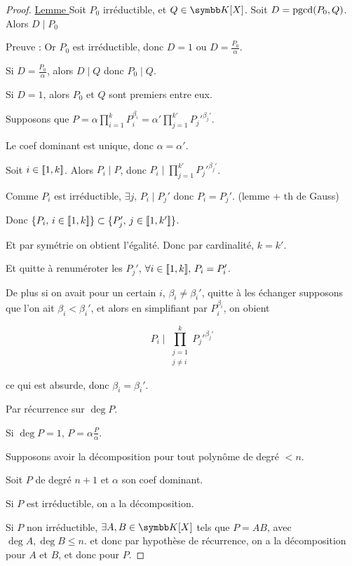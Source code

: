 
\begin{proof}
    \uline{Lemme } Soit $P_0$ irréductible, et $Q \in \K[X]$. Soit $D = \operatorname{pgcd}(P_0, Q)$.
    Alors $D \mid P_0$

    \avspace Preuve : Or $P_0$ est irréductible, donc $D = 1$ ou $D = \frac {P_0} \alpha$.

    Si $D = \frac {P_0} \alpha$, alors $D \mid Q$ donc $P_0 \mid Q$.

    Si $D = 1$, alors $P_0$ et $Q$ sont premiers entre eux.

    \lvspace {}

    Supposons que $\displaystyle P = \alpha \prod_{i = 1}^k P_i^{\beta_i} = \alpha' \prod_{j = 1}^{k'} P_j'^{\beta_j'}$.

    Le coef dominant est unique, donc $\alpha = \alpha'$.

    Soit $i \in [\![1, k]\!]$. Alors $P_i \mid P$, donc $\displaystyle P_i \mid \prod_{j = 1}^{k'} P_j'^{\beta_j'}$.

    Comme $P_i$ est irréductible, $\exists j, \, P_i \mid P_j'$ donc $P_i = P_j'$. (lemme + th de Gauss)

    Donc $\{P_i, \, i \in [\![1, k]\!] \} \subset \{P_j', \, j \in [\![1, k']\!]\}$.

    Et par symétrie on obtient l'égalité. Donc par cardinalité, $k = k'$.

    Et quitte à renuméroter les $P_j'$, $\forall i \in [\![1, k]\!], \, P_i = P_i'$.

    De plus si on avait pour un certain $i$, $\beta_i \neq \beta_i'$, quitte à les échanger supposons 
    que l'on ait $\beta_i < \beta_i'$, et alors en simplifiant par $P_i^{\beta_i}$, on obient
    
    \[P_i \mid \prod_{\substack{j = 1 \\ j \neq i}}^k P_j'^{\beta_j'}\]

    ce qui est absurde, donc $\beta_i = \beta_i'$.


    Par récurrence sur $\deg P$. 

    Si $\deg P = 1$, $P = \alpha \frac P \alpha$. 

    Supposons avoir la décomposition pour tout polynôme de degré $< n$. 

    Soit $P$ de degré $n + 1$ et $\alpha$ son coef dominant.

    Si $P$ est irréductible, on a la décomposition.

    Si $P$ non irréductible, $\exists A, B \in \K[X]$ tels que $P = AB$, avec $\deg A, \deg B \leqslant n$.
    et donc par hypothèse de récurrence, on a la décomposition pour $A$ et $B$, et donc pour $P$.
\end{proof}

